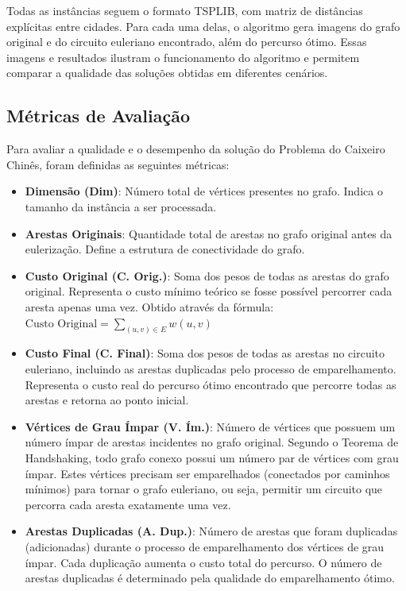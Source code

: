 \documentclass[12pt]{article}
\begin{document}
Todas as instâncias seguem o formato TSPLIB, com matriz de distâncias explícitas entre cidades. Para cada uma delas, o algoritmo gera imagens do grafo original e do circuito euleriano encontrado, além do percurso ótimo. Essas imagens e resultados ilustram o funcionamento do algoritmo e permitem comparar a qualidade das soluções obtidas em diferentes cenários.

\subsection{Métricas de Avaliação}

Para avaliar a qualidade e o desempenho da solução do Problema do Caixeiro Chinês, foram definidas as seguintes métricas:

\begin{itemize}
    \item \textbf{Dimensão (Dim)}: Número total de vértices presentes no grafo. Indica o tamanho da instância a ser processada.
    
    \item \textbf{Arestas Originais}: Quantidade total de arestas no grafo original antes da eulerização. Define a estrutura de conectividade do grafo.
    
    \item \textbf{Custo Original (C. Orig.)}: Soma dos pesos de todas as arestas do grafo original. Representa o custo mínimo teórico se fosse possível percorrer cada aresta apenas uma vez. Obtido através da fórmula: $\text{Custo Original} = \sum_{(u,v) \in E} w(u,v)$
    
    \item \textbf{Custo Final (C. Final)}: Soma dos pesos de todas as arestas no circuito euleriano, incluindo as arestas duplicadas pelo processo de emparelhamento. Representa o custo real do percurso ótimo encontrado que percorre todas as arestas e retorna ao ponto inicial.
    
    \item \textbf{Vértices de Grau Ímpar (V. Ím.)}: Número de vértices que possuem um número ímpar de arestas incidentes no grafo original. Segundo o Teorema de Handshaking, todo grafo conexo possui um número par de vértices com grau ímpar. Estes vértices precisam ser emparelhados (conectados por caminhos mínimos) para tornar o grafo euleriano, ou seja, permitir um circuito que percorra cada aresta exatamente uma vez.
    
    \item \textbf{Arestas Duplicadas (A. Dup.)}: Número de arestas que foram duplicadas (adicionadas) durante o processo de emparelhamento dos vértices de grau ímpar. Cada duplicação aumenta o custo total do percurso. O número de arestas duplicadas é determinado pela qualidade do emparelhamento ótimo.
    

\end{itemize}
\end{document}
